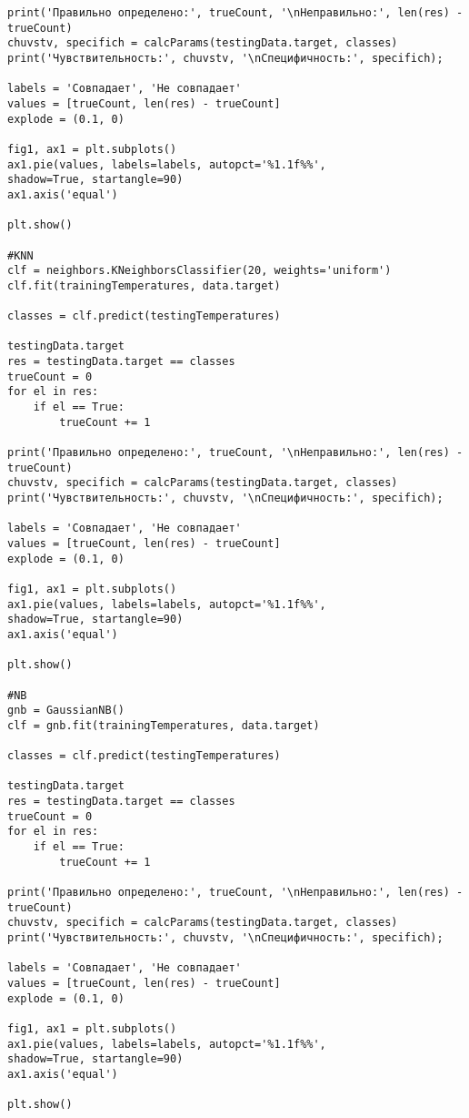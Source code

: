 \begin{verbatim}
print('Правильно определено:', trueCount, '\nНеправильно:', len(res) - trueCount)
chuvstv, specifich = calcParams(testingData.target, classes)
print('Чувствительность:', chuvstv, '\nСпецифичность:', specifich);

labels = 'Совпадает', 'Не совпадает'
values = [trueCount, len(res) - trueCount]
explode = (0.1, 0)

fig1, ax1 = plt.subplots()
ax1.pie(values, labels=labels, autopct='%1.1f%%',
shadow=True, startangle=90)
ax1.axis('equal')

plt.show()

#KNN
clf = neighbors.KNeighborsClassifier(20, weights='uniform')
clf.fit(trainingTemperatures, data.target)

classes = clf.predict(testingTemperatures)

testingData.target
res = testingData.target == classes
trueCount = 0
for el in res:
	if el == True:
		trueCount += 1

print('Правильно определено:', trueCount, '\nНеправильно:', len(res) - trueCount)
chuvstv, specifich = calcParams(testingData.target, classes)
print('Чувствительность:', chuvstv, '\nСпецифичность:', specifich);

labels = 'Совпадает', 'Не совпадает'
values = [trueCount, len(res) - trueCount]
explode = (0.1, 0)

fig1, ax1 = plt.subplots()
ax1.pie(values, labels=labels, autopct='%1.1f%%',
shadow=True, startangle=90)
ax1.axis('equal')

plt.show()

#NB
gnb = GaussianNB()
clf = gnb.fit(trainingTemperatures, data.target)

classes = clf.predict(testingTemperatures)

testingData.target
res = testingData.target == classes
trueCount = 0
for el in res:
	if el == True:
		trueCount += 1

print('Правильно определено:', trueCount, '\nНеправильно:', len(res) - trueCount)
chuvstv, specifich = calcParams(testingData.target, classes)
print('Чувствительность:', chuvstv, '\nСпецифичность:', specifich);

labels = 'Совпадает', 'Не совпадает'
values = [trueCount, len(res) - trueCount]
explode = (0.1, 0)

fig1, ax1 = plt.subplots()
ax1.pie(values, labels=labels, autopct='%1.1f%%',
shadow=True, startangle=90)
ax1.axis('equal')

plt.show()
\end{verbatim}
\vspace{8mm}
\Large